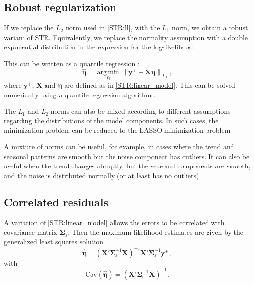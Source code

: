 \documentclass[ijds,nonblindrev]{informs-ijds}
\begin{document}
\hypertarget{robust-regularization}{%
\subsection{Robust regularization}\label{robust-regularization}}

If we replace the \(L_2\) norm used in \eqref{STR:ll}, with the \(L_1\) norm, we obtain a robust variant of STR. Equivalently, we replace the normality assumption with a double exponential distribution in the expression for the log-likelihood.

This can be written as a quantile regression \citep{koenker2005quantile}:
\begin{equation}
  \label{RSTR:qr}
  \hat{\bm\eta} = \operatorname{arg\,min}\limits_{\bm\eta} \left\|\bm{y}^{+}-\bm{X}\bm{\eta}\right\|_{L_1}\ ,
\end{equation}
where \(\bm{y}^{+}\), \(\bm{X}\) and \(\bm\eta\) are defined as in \eqref{STR:linear_model}. This can be solved numerically using a quantile regression algorithm \citep{quantregR}.

The \(L_1\) and \(L_2\) norms can also be mixed according to different assumptions regarding the distributions of the model components. In such cases, the minimization problem can be reduced to the LASSO minimization problem.

A mixture of norms can be useful, for example, in cases where the trend and seasonal patterns are smooth but the noise component has outliers. It can also be useful when the trend changes abruptly, but the seasonal components are smooth, and the noise is distributed normally (or at least has no outliers).

\hypertarget{correlated-residuals}{%
\subsection{Correlated residuals}\label{correlated-residuals}}

A variation of \eqref{STR:linear_model} allows the errors to be correlated with covariance matrix \(\bm{\Sigma}_\varepsilon\). Then the maximum likelihood estimates are given by the generalized least squares solution
\begin{equation}
\label{STR:solution_GLS}
\hat{\bm\eta} = (\bm{X}'\bm{\Sigma}_\varepsilon^{-1}\bm{X})^{-1}\bm{X}'\bm{\Sigma}_\varepsilon^{-1} \bm{y}^{+} ,
\end{equation}
with
\begin{equation}
\label{STR:beta_covar_STR}
\text{Cov}(\hat{\bm\eta}) = (\bm{X}'\bm{\Sigma}_\varepsilon^{-1}\bm{X})^{-1} .
\end{equation}
\end{document}
